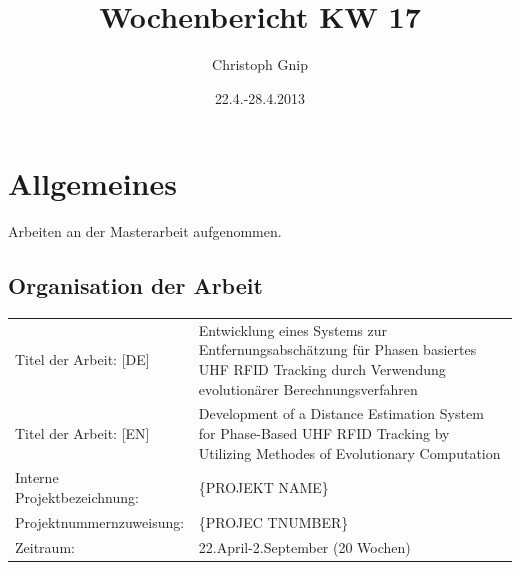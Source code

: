 ﻿\documentclass[a4paper,12pt,fleqn]{scrartcl}
\title{Wochenbericht KW 17}
\author{Christoph Gnip}
\date{ 22.4.-28.4.2013 }
\begin{document}
\setlength{\headheight}{36pt}
\begin{titlepage}

\maketitle

\thispagestyle{empty}



\end{titlepage}

\section[Allgemeines]{Allgemeines}
Arbeiten an der Masterarbeit aufgenommen.
\subsection{Organisation der Arbeit}
\begin{table}[right]
    \begin{tabular}{lp{11cm}}
      Titel der Arbeit:  [DE]&
      Entwicklung eines Systems zur Entfernungsabschätzung für Phasen basiertes
      UHF RFID Tracking durch Verwendung evolutionärer Berechnungsverfahren \\
      Titel der Arbeit:  [EN]&
      Development of a Distance Estimation System for Phase-Based UHF RFID
      Tracking  by Utilizing Methodes of Evolutionary Computation \\
      Interne Projektbezeichnung: &  \{PROJEKT NAME\}\\
      Projektnummernzuweisung: & \{PROJEC TNUMBER\} \\
      Zeitraum: &22.April-2.September (20 Wochen) \\

    \end{tabular}
\end{table}
\end{document}
